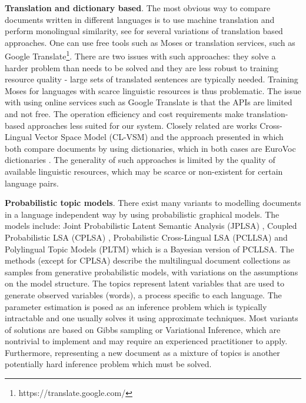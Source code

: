 \documentclass[twoside,11pt]{article}
\begin{document}
\textbf{Translation and dictionary based}. The most obvious way to compare documents written in different languages is to use machine translation and perform monolingual similarity, see  \cite{multilingualBook}\cite{plagiarism} for several variations of translation based approaches. One can use free tools such as Moses  or translation services, such as Google Translate\footnote{https://translate.google.com/}. There are two issues with such approaches: they solve a harder problem than needs to be solved and they are less robust to training resource quality - large sets of translated sentences are typically needed. Training Moses for languages with scarce linguistic resources is thus problematic. The issue with using online services such as Google Translate is that the APIs are limited and not free. The operation efficiency and cost requirements make translation-based approaches less suited for our system. Closely related are works Cross-Lingual Vector Space Model (CL-VSM) \cite{plagiarism} and the approach presented in \cite{pouliquen2008story} which both compare documents by using dictionaries, which in both cases are EuroVoc dictionaries \cite{eurovoc}. The generality of such approaches is limited by the quality of available linguistic resources, which may be scarce or non-existent for certain language pairs.

\textbf{Probabilistic topic models}. There exist many variants to modelling documents in a language independent way by using probabilistic graphical models. The models include:  Joint Probabilistic Latent Semantic Analysis (JPLSA) , Coupled Probabilistic LSA (CPLSA) \cite{platt2010translingual}, Probabilistic Cross-Lingual LSA (PCLLSA)\cite{PCL_LSA} and Polylingual Topic Models (PLTM)  which is a Bayesian version of PCLLSA. The methods (except for CPLSA) describe the multilingual document collections as samples from generative probabilistic models, with variations on the assumptions on the model structure. The topics represent latent variables that are used to generate observed variables (words), a process specific to each language. The parameter estimation is posed as an inference problem which is typically intractable and one usually solves it using approximate techniques. Most variants of solutions are based on Gibbs sampling or Variational Inference, which are nontrivial to implement and may require an experienced practitioner to apply. Furthermore, representing a new document as a mixture of topics is another potentially hard inference problem which must be solved.
\end{document}
